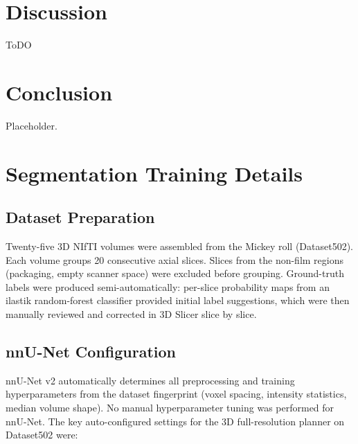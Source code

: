 \documentclass[11pt,a4paper]{article}
\begin{document}

\section{Discussion}

ToDO


\section{Conclusion}

Placeholder.


\appendix

\section{Segmentation Training Details}
\label{app:seg_training}

\subsection{Dataset Preparation}

Twenty-five 3D NIfTI volumes were assembled from the Mickey roll (Dataset502). Each volume groups 20 consecutive axial slices. Slices from the non-film regions (packaging, empty scanner space) were excluded before grouping. Ground-truth labels were produced semi-automatically: per-slice probability maps from an ilastik random-forest classifier provided initial label suggestions, which were then manually reviewed and corrected in 3D Slicer slice by slice.

\subsection{nnU-Net Configuration}

nnU-Net v2 automatically determines all preprocessing and training hyperparameters from the dataset fingerprint (voxel spacing, intensity statistics, median volume shape). No manual hyperparameter tuning was performed for nnU-Net. The key auto-configured settings for the 3D full-resolution planner on Dataset502 were:
\end{document}
